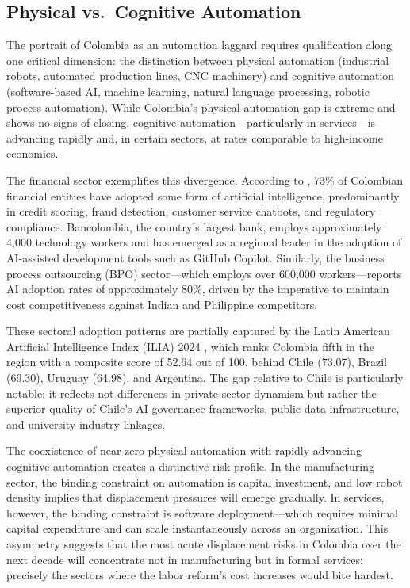 \subsection{Physical vs.\ Cognitive Automation}
\label{subsec:physical_cognitive}

The portrait of Colombia as an automation laggard requires qualification along one critical dimension: the distinction between physical automation (industrial robots, automated production lines, CNC machinery) and cognitive automation (software-based AI, machine learning, natural language processing, robotic process automation). While Colombia's physical automation gap is extreme and shows no signs of closing, cognitive automation---particularly in services---is advancing rapidly and, in certain sectors, at rates comparable to high-income economies.

The financial sector exemplifies this divergence. According to \cite{asobancaria2024}, 73\% of Colombian financial entities have adopted some form of artificial intelligence, predominantly in credit scoring, fraud detection, customer service chatbots, and regulatory compliance. Bancolombia, the country's largest bank, employs approximately 4,000 technology workers and has emerged as a regional leader in the adoption of AI-assisted development tools such as GitHub Copilot. Similarly, the business process outsourcing (BPO) sector---which employs over 600,000 workers---reports AI adoption rates of approximately 80\%, driven by the imperative to maintain cost competitiveness against Indian and Philippine competitors.

These sectoral adoption patterns are partially captured by the Latin American Artificial Intelligence Index (ILIA) 2024 \cite{ilia2024}, which ranks Colombia fifth in the region with a composite score of 52.64 out of 100, behind Chile (73.07), Brazil (69.30), Uruguay (64.98), and Argentina. The gap relative to Chile is particularly notable: it reflects not differences in private-sector dynamism but rather the superior quality of Chile's AI governance frameworks, public data infrastructure, and university-industry linkages.

The coexistence of near-zero physical automation with rapidly advancing cognitive automation creates a distinctive risk profile. In the manufacturing sector, the binding constraint on automation is capital investment, and low robot density implies that displacement pressures will emerge gradually. In services, however, the binding constraint is software deployment---which requires minimal capital expenditure and can scale instantaneously across an organization. This asymmetry suggests that the most acute displacement risks in Colombia over the next decade will concentrate not in manufacturing but in formal services: precisely the sectors where the labor reform's cost increases would bite hardest.


